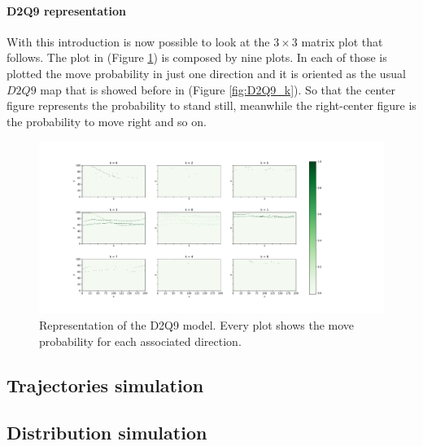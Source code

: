 \documentclass[class=article, crop=false]{standalone}
\begin{document}
\paragraph{D2Q9 representation}
With this introduction is now possible to look at the $3\times3$ matrix plot that follows.
The plot in (Figure \ref{fig:5pids_D2Q9}) is composed by nine plots.
In each of those is plotted the move probability in just one direction and it is oriented as the usual $D2Q9$ map that is showed before in (Figure \ref{fig:D2Q9_k}).
So that the center figure represents the probability to stand still, meanwhile the right-center figure is the probability to move right and so on.
\begin{figure}[h]
\centering
\includegraphics[scale=0.25]{fig/5pids/figure_trainf10_few_trajectories_Dx200_Dy100_D2Q9}
\captionsetup{width=.6\linewidth}
\caption{Representation of the D2Q9 model. Every plot shows the move probability for each associated direction.}
\label{fig:5pids_D2Q9}
\end{figure}




\FloatBarrier
\subsection{Trajectories simulation}


\FloatBarrier
\subsection{Distribution simulation}
\end{document}
